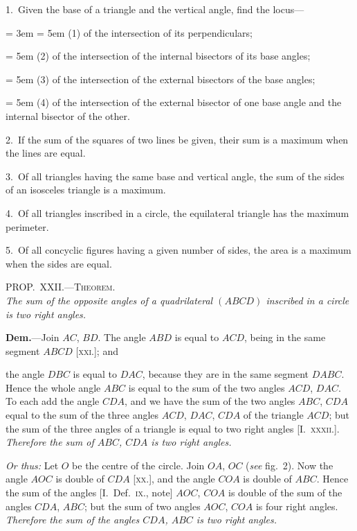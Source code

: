 \documentclass[oneside]{book}
\newcommand\myprop[2]{
\bigskip\Needspace*{4\baselineskip}\begin{center}\textsc{#1}\\\medskip\emph{#2}\par\end{center}
}
\newcommand\imgcent[2]{
\begin{center}

\end{center}
}
\begin{document}
\begin{footnotesize}
1.~Given the base of a triangle and the vertical angle, find the
locus---

{\parindent= 3em
\hangindent= 5em
(1) of the intersection of its perpendiculars;

\hangindent= 5em
(2) of the intersection of the internal bisectors of its base
angles;

\hangindent= 5em
(3) of the intersection of the external bisectors of the base
angles;

\hangindent= 5em
(4) of the intersection of the external bisector of one base
angle and the internal bisector of the other.
}

2.~If the sum of the squares of two lines be given, their sum
is a maximum when the lines are equal.

3.~Of all triangles having the same base and vertical angle, the
sum of the sides of an isosceles triangle is a maximum.

4.~Of all triangles inscribed in a circle, the equilateral triangle
has the maximum perimeter.

5.~Of all concyclic figures having a given number of sides, the
area is a maximum when the sides are equal.
\par\end{footnotesize}

\myprop{PROP\@.~XXII\@.---Theorem.}{The sum of the opposite angles of a quadrilateral $(ABCD)$
inscribed in a circle is two right angles.}


\imgcent{225}{f129}

\textbf{Dem.}---Join $AC$, $BD$. The angle $ABD$ is equal to
$ACD$, being in the same segment $ABCD$ [\textsc{xxi.}]; and

the angle $DBC$ is equal to $DAC$, because they are in
the same segment $DABC$. Hence the whole angle $ABC$
is equal to the sum of the two angles $ACD$, $DAC$. To
each add the angle $CDA$, and we have the sum of the
two angles $ABC$, $CDA$ equal to the sum of the three
angles $ACD$, $DAC$, $CDA$ of the triangle $ACD$; but the
sum of the three angles of a triangle is equal to two
right angles [I.~\textsc{xxxii.}]. \emph{Therefore the sum of $ABC$,
$CDA$ is two right angles.}

\emph{Or thus:} Let $O$ be the centre of the circle. Join
$OA$, $OC$ (\emph{see} fig.~2). Now the angle $AOC$ is double of
$CDA$ [\textsc{xx.}], and the angle $COA$ is double of $ABC$.
Hence the sum of the angles [I.~Def.~\textsc{ix.}, note]
$AOC$, $COA$ is double of the sum of the angles $CDA$,
$ABC$; but the sum of two angles $AOC$, $COA$ is four
right angles. \emph{Therefore the sum of the angles $CDA$,
$ABC$ is two right angles.}
\end{document}
